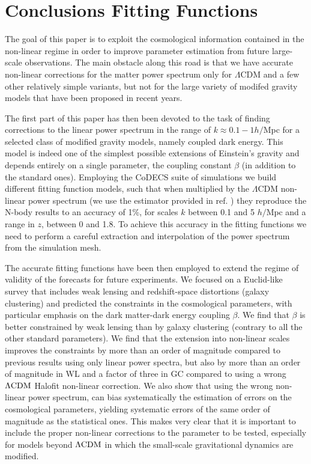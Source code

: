 \section{Conclusions Fitting Functions}

The goal of this paper is to exploit the cosmological information
contained in the non-linear regime in order to improve parameter estimation
from future large-scale observations. The main obstacle along this
road is that we have accurate non-linear corrections for the matter
power spectrum only for $\Lambda$CDM and a few other relatively simple
variants, but not for the large variety of modifed gravity models
that have been proposed in recent years.

The first part of this paper has then been devoted to the task of
finding corrections to the linear power spectrum in the range of $k\approx0.1-1h/$Mpc
for a selected class of modified gravity models, namely coupled dark
energy. This model is indeed one of the simplest possible extensions
of Einstein's gravity and depends entirely on a single parameter,
the coupling constant $\beta$ (in addition to the standard ones).
Employing the CoDECS suite of simulations \citep{baldi_codecs_2012}
we build different fitting function models, such that when multiplied
by the $\Lambda$CDM non-linear power spectrum (we use the estimator
provided in ref. \citep{heitmann_coyote_2014} ) they reproduce the
N-body results to an accuracy of 1\%, for scales $k$ between 0.1
and 5 $h/\mbox{Mpc}$ and a range in $z$, between 0 and 1.8. To achieve
this accuracy in the fitting functions we need to perform a careful
extraction and interpolation of the power spectrum from the simulation
mesh.

The accurate fitting functions have been then employed to extend the
regime of validity of the forecasts for future experiments. We focused
on a Euclid-like survey that includes weak lensing and redshift-space
distortions (galaxy clustering) and predicted the constraints in the
cosmological parameters, with particular emphasis on the dark matter-dark
energy coupling $\beta$. We find that $\beta$ is better constrained
by weak lensing than by galaxy clustering (contrary to all the other
standard parameters). We find that the extension into non-linear scales
improves the constraints by more than an order of magnitude compared
to previous results using only linear power spectra, but also by more
than an order of magnitude in WL and a factor of three in GC compared
to using a wrong $\Lambda\mathrm{CDM}$ Halofit non-linear correction. We also show
that using the wrong non-linear power spectrum, can bias systematically
the estimation of errors on the cosmological parameters, yielding
systematic errors of the same order of magnitude as the statistical
ones. This makes very clear that it is important to include the proper
non-linear corrections to the parameter to be tested, especially for
models beyond $\Lambda\mathrm{CDM}$ in which the small-scale gravitational dynamics
are modified.


